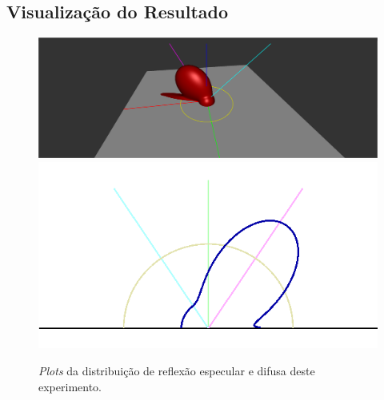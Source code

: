 \subsection{Visualização do Resultado}
\begin{figure}[H]
    \caption{\small{\textit{Plots} da distribuição de reflexão especular e difusa deste experimento.}}
    \label{fig-ward-plots}

    \vspace{42px}
  \includegraphics[width=\linewidth]{./Imagens/brdfs/ward-3D-plot}
\endminipage\hfill
{}
  \includegraphics[width=\linewidth]{./Imagens/brdfs/ward-polar-plot.png}
\endminipage\hfill
\end{figure}

